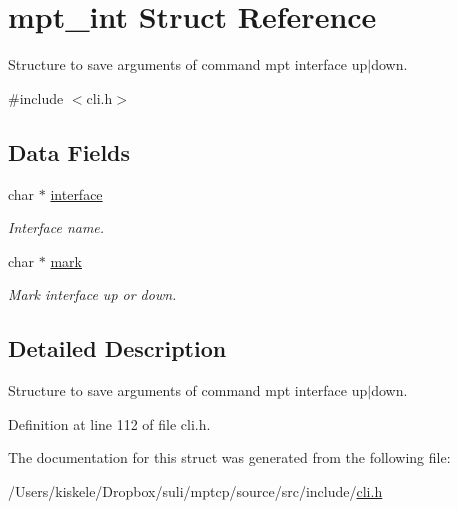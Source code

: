 \hypertarget{structmpt__int}{\section{mpt\-\_\-int Struct Reference}
\label{structmpt__int}
}


Structure to save arguments of command mpt interface up$|$down.  




{\ttfamily \#include $<$cli.\-h$>$}

\subsection*{Data Fields}
\begin{DoxyCompactItemize}
\item 
\hypertarget{structmpt__int_af663a7576d2f8f288bb3996381484cd3}{char $\ast$ \hyperlink{structmpt__int_af663a7576d2f8f288bb3996381484cd3}{interface}}\label{structmpt__int_af663a7576d2f8f288bb3996381484cd3}

\begin{DoxyCompactList}\small\item\em Interface name. \end{DoxyCompactList}\item 
\hypertarget{structmpt__int_af34a496b61ba99953cf618a41fc44b0b}{char $\ast$ \hyperlink{structmpt__int_af34a496b61ba99953cf618a41fc44b0b}{mark}}\label{structmpt__int_af34a496b61ba99953cf618a41fc44b0b}

\begin{DoxyCompactList}\small\item\em Mark interface up or down. \end{DoxyCompactList}\end{DoxyCompactItemize}


\subsection{Detailed Description}
Structure to save arguments of command mpt interface up$|$down. 

Definition at line 112 of file cli.\-h.



The documentation for this struct was generated from the following file\-:\begin{DoxyCompactItemize}
\item 
/\-Users/kiskele/\-Dropbox/suli/mptcp/source/src/include/\hyperlink{cli_8h}{cli.\-h}\end{DoxyCompactItemize}
